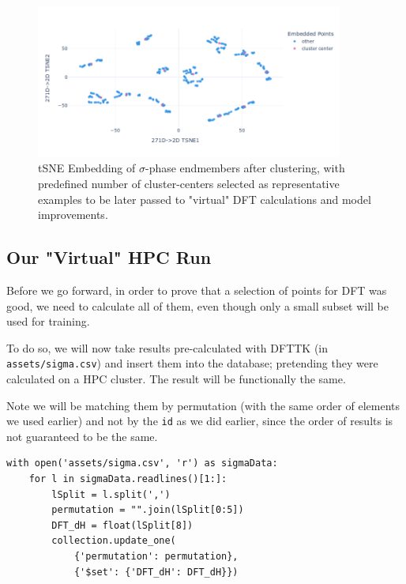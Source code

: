 \begin{figure}
    \centering
    \includegraphics[width=0.9\textwidth]{pysipfennTutorial2/Lecture2_69_0.png}
    \caption{tSNE Embedding of $\sigma$-phase endmembers after clustering, with predefined number of cluster-centers selected as representative examples to be later passed to "virtual" DFT calculations and model improvements.}
    \label{pysipfenntutorial2:tsnefig2}
\end{figure}

\hypertarget{our-virtual-hpc-run}{%
\subsection{Our "Virtual" HPC Run}\label{pysipfenntutorial2:our-virtual-hpc-run}}

Before we go forward, in order to prove that a selection of points for
DFT was good, we need to calculate all of them, even though only a small
subset will be used for training.

To do so, we will now take results pre-calculated with DFTTK (in
\texttt{assets/sigma.csv}) and insert them into the
database; pretending they were calculated on a HPC cluster. The result
will be functionally the same.

Note we will be matching them by permutation (with the same order of
elements we used earlier) and not by the \texttt{id} as
we did earlier, since the order of results is not guaranteed to be the
same.

\begin{verbatim}
with open('assets/sigma.csv', 'r') as sigmaData:
    for l in sigmaData.readlines()[1:]:
        lSplit = l.split(',')
        permutation = "".join(lSplit[0:5])
        DFT_dH = float(lSplit[8])
        collection.update_one(
            {'permutation': permutation}, 
            {'$set': {'DFT_dH': DFT_dH}})
\end{verbatim}

